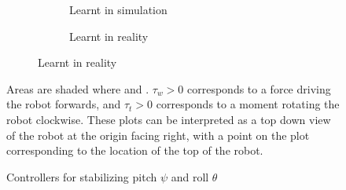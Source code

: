 \documentclass[main.tex]{subfiles}
\begin{document}
\begin{figure}
\begin{subfigure}[t]{\linewidth}
			\begin{subfigure}{(\linewidth - 2\ctlpadding)/3}
				\caption{Learnt in simulation}
			\end{subfigure}\hfill
			\begin{subfigure}{(\linewidth - 2\ctlpadding)/3}
				\caption{Learnt in reality}
			\end{subfigure}
		\end{subfigure}
		\caption{Controllers for stabilizing pitch $\psi$ and roll $\theta$}
		\label{fig:balancing}
		\medskip
		\small
		Areas are shaded where  and .
		$\tau_w > 0$ corresponds to a force driving the robot forwards, and $\tau_t > 0$ corresponds to a moment rotating the robot clockwise.
		These plots can be interpreted as a top down view of the robot at the origin facing right, with a point on the plot corresponding to the location of the top of the robot.

	\end{figure}
\end{document}
